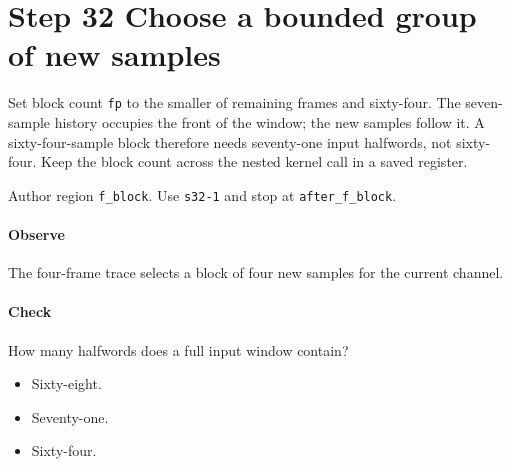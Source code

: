 \section{Step 32 Choose a bounded group of new samples}\label{pcm-wav-s32}
Set block count \texttt{fp} to the smaller of remaining frames and sixty-four. The seven-sample history occupies the front of the window; the new samples follow it. A sixty-four-sample block therefore needs seventy-one input halfwords, not sixty-four. Keep the block count across the nested kernel call in a saved register.

Author region \texttt{f\_block}. Use \texttt{s32-1} and stop at \texttt{after\_f\_block}.

\paragraph{Observe} The four-frame trace selects a block of four new samples for the current channel.

\paragraph{Check} How many halfwords does a full input window contain?
\begin{itemize}
\item[A.] Sixty-eight.
\item[B.] Seventy-one.
\item[C.] Sixty-four.
\end{itemize}
